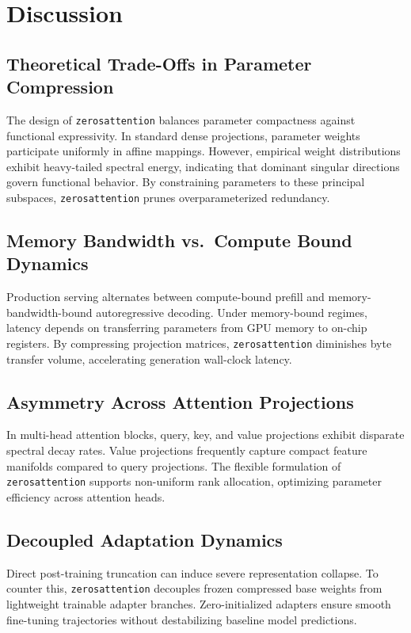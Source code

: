 \section{Discussion}

\subsection{Theoretical Trade-Offs in Parameter Compression}
The design of \texttt{zerosattention} balances parameter compactness against functional expressivity. In standard dense projections, parameter weights participate uniformly in affine mappings. However, empirical weight distributions exhibit heavy-tailed spectral energy, indicating that dominant singular directions govern functional behavior. By constraining parameters to these principal subspaces, \texttt{zerosattention} prunes overparameterized redundancy.

\subsection{Memory Bandwidth vs.\ Compute Bound Dynamics}
Production serving alternates between compute-bound prefill and memory-bandwidth-bound autoregressive decoding. Under memory-bound regimes, latency depends on transferring parameters from GPU memory to on-chip registers. By compressing projection matrices, \texttt{zerosattention} diminishes byte transfer volume, accelerating generation wall-clock latency.

\subsection{Asymmetry Across Attention Projections}
In multi-head attention blocks, query, key, and value projections exhibit disparate spectral decay rates. Value projections frequently capture compact feature manifolds compared to query projections. The flexible formulation of \texttt{zerosattention} supports non-uniform rank allocation, optimizing parameter efficiency across attention heads.

\subsection{Decoupled Adaptation Dynamics}
Direct post-training truncation can induce severe representation collapse. To counter this, \texttt{zerosattention} decouples frozen compressed base weights from lightweight trainable adapter branches. Zero-initialized adapters ensure smooth fine-tuning trajectories without destabilizing baseline model predictions.

